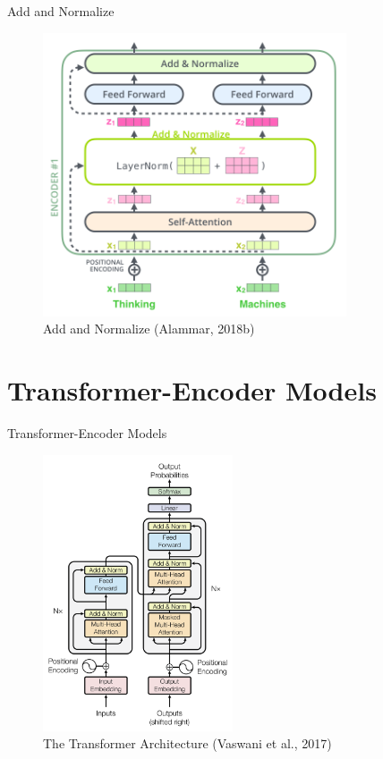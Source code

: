 \documentclass[10pt]{beamer}
\begin{document}
\begin{frame}{Add and Normalize}

\begin{figure}[h]
\centering
\includegraphics[width=0.8\textwidth]{fig/alammar_transformer_resideual_layer_norm_2.png}
\caption{Add and Normalize (Alammar, 2018b)}
\end{figure}

\end{frame}

\section{Transformer-Encoder Models}

\begin{frame}{Transformer-Encoder Models}

\begin{figure}[h]
\centering
\includegraphics[width=0.5\textwidth]{fig/Vaswani_1_transformer.png}
\caption{The Transformer Architecture (Vaswani et al., 2017)}
\end{figure}

\end{frame}
\end{document}

